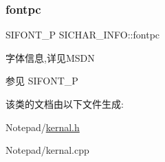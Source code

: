 \subsubsection{\texorpdfstring{fontpc}{fontpc}}
{\footnotesize\ttfamily S\+I\+F\+O\+N\+T\+\_\+P S\+I\+C\+H\+A\+R\+\_\+\+I\+N\+F\+O\+::fontpc}



字体信息,详见\+M\+S\+DN 

\begin{DoxySeeAlso}{参见}
S\+I\+F\+O\+N\+T\+\_\+P 
\end{DoxySeeAlso}


该类的文档由以下文件生成\+:\begin{DoxyCompactItemize}
\item 
Notepad/\hyperlink{kernal_8h}{kernal.\+h}\item 
Notepad/kernal.\+cpp\end{DoxyCompactItemize}
